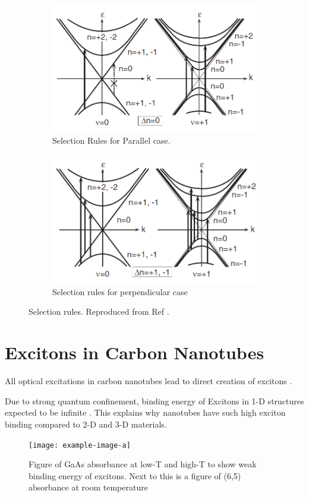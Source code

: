 \begin{figure}[H]
	\centering
	\begin{subfigure}{\textwidth}
		\centering
		\includegraphics[scale=0.7]{images/chapter_optical_props/selection_rules_1.png}
		\caption{Selection Rules for Parallel case.}
	\end{subfigure}
	\begin{subfigure}{\textwidth}
		\centering
		\includegraphics[scale=0.7]{images/chapter_optical_props/selection_rules_2.png}
		\caption{Selection rules for perpendicular case}
	\end{subfigure}
	\caption{Selection rules. Reproduced from Ref \cite{ando2005theory}.}
	\label{fig:selection_rules}
\end{figure}

\section{Excitons in Carbon Nanotubes}
All optical excitations in carbon nanotubes lead to direct creation of excitons \cite{wang2005optical}.

Due to strong quantum confinement, binding energy of Excitons in 1-D structures expected to be infinite \cite{ando2005theory}. This explains why nanotubes have such high exciton binding compared to 2-D and 3-D materials. 
 
\begin{figure}[h]
	\centering
	\texttt{[image: example-image-a]}
	\caption{Figure of GaAs absorbance at low-T and high-T to show weak binding energy of excitons. Next to this is a figure of  (6,5) absorbance at room temperature}
	\label{fig:gaas_vs_cnt_absorbance}
\end{figure}
